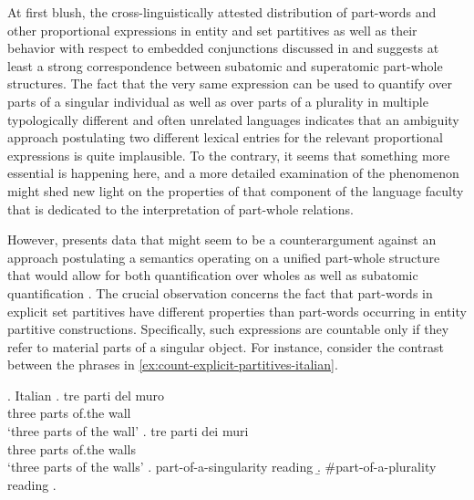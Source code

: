 At first blush, the cross-linguistically attested distribution of part-words and other proportional expressions in entity and set partitives as well as their behavior with respect to embedded conjunctions discussed in  and  suggests at least a strong correspondence between subatomic and superatomic part-whole structures. The fact that the very same expression can be used to quantify over parts of a singular individual as well as over parts of a plurality in multiple typologically different and often unrelated languages indicates that an ambiguity approach postulating two different lexical entries for the relevant proportional expressions is quite implausible. To the contrary, it seems that something more essential is happening here, and a more detailed examination of the phenomenon might shed new light on the properties of that component of the language faculty that is dedicated to the interpretation of part-whole relations.

However, \citet{schwarzschild1996pluralities} presents data that might seem to be a counterargument against an approach postulating a semantics operating on a unified part-whole structure that would allow for both quantification over wholes as well as subatomic quantification \citep[see][]{moltmann1997parts,moltmann1998part}. The crucial observation concerns the fact that part-words in explicit set partitives have different properties than part-words occurring in entity partitive constructions. Specifically, such expressions are countable only if they refer to material parts of a singular object. For instance, consider the contrast between the phrases in \ref{ex:count-explicit-partitives-italian}. 

\ex.\label{ex:count-explicit-partitives-italian} Italian \citep[p. 186; adapted]{schwarzschild1996pluralities}
\ag. tre parti del muro\label{ex:count-explicit-entity-partitives-italian}\\
three parts of.the wall\\
`three parts of the wall'
\bg. tre parti dei muri\label{ex:count-explicit-set-partitives-italian}\\
three parts of.the walls\\
`three parts of the walls'
\a. part-of-a-singularity reading
\b. \#part-of-a-plurality reading
\z.

